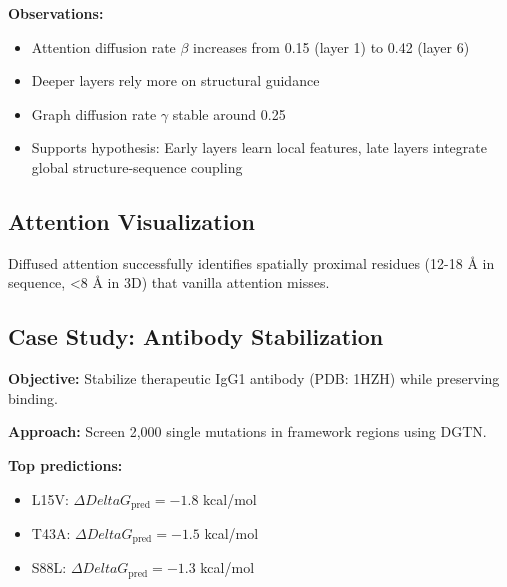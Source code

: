 \documentclass[11pt]{article}
\begin{document}
\textbf{Observations:}
\begin{itemize}
    \item Attention diffusion rate $\beta$ increases from 0.15 (layer 1) to 0.42 (layer 6)
    \item Deeper layers rely more on structural guidance
    \item Graph diffusion rate $\gamma$ stable around 0.25
    \item Supports hypothesis: Early layers learn local features, late layers integrate global structure-sequence coupling
\end{itemize}

\subsection{Attention Visualization}


Diffused attention successfully identifies spatially proximal residues (12-18 Å in sequence, <8 Å in 3D) that vanilla attention misses.

\subsection{Case Study: Antibody Stabilization}

\textbf{Objective:} Stabilize therapeutic IgG1 antibody (PDB: 1HZH) while preserving binding.

\textbf{Approach:} Screen 2,000 single mutations in framework regions using DGTN.

\textbf{Top predictions:}
\begin{itemize}
    \item L15V: $\Delta Delta G_{\text{pred}} = -1.8$ kcal/mol
    \item T43A: $\Delta Delta G_{\text{pred}} = -1.5$ kcal/mol
    \item S88L: $\Delta Delta G_{\text{pred}} = -1.3$ kcal/mol
\end{itemize}
\end{document}
